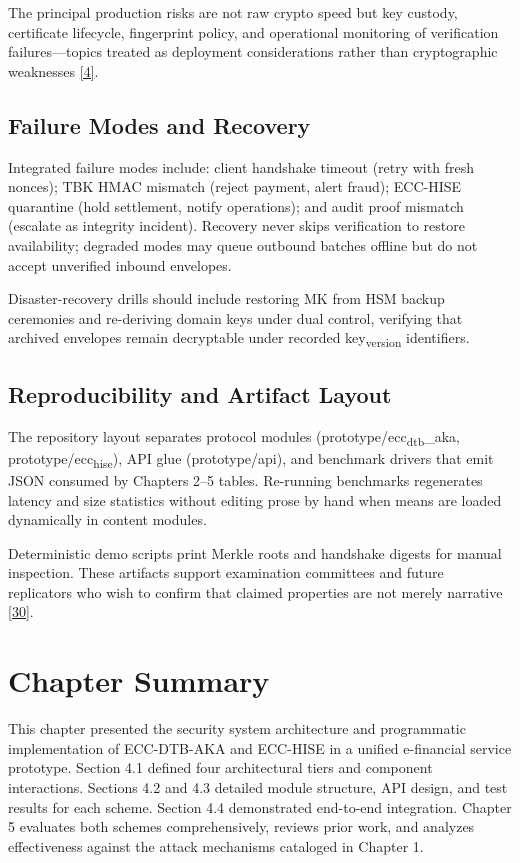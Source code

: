 \indent The principal production risks are not raw crypto speed but key custody, certificate lifecycle, fingerprint policy, and operational monitoring of verification failures---topics treated as deployment considerations rather than cryptographic weaknesses \hyperref[ref:4]{[4]}.

\subsection{Failure Modes and Recovery}

\indent Integrated failure modes include: client handshake timeout (retry with fresh nonces); TBK HMAC mismatch (reject payment, alert fraud); ECC-HISE quarantine (hold settlement, notify operations); and audit proof mismatch (escalate as integrity incident). Recovery never skips verification to restore availability; degraded modes may queue outbound batches offline but do not accept unverified inbound envelopes.

\indent Disaster-recovery drills should include restoring MK from HSM backup ceremonies and re-deriving domain keys under dual control, verifying that archived envelopes remain decryptable under recorded key\textsubscript{version} identifiers.

\subsection{Reproducibility and Artifact Layout}

\indent The repository layout separates protocol modules (prototype/ecc\textsubscript{dtb}\_aka, prototype/ecc\textsubscript{hise}), API glue (prototype/api), and benchmark drivers that emit JSON consumed by Chapters 2--5 tables. Re-running benchmarks regenerates latency and size statistics without editing prose by hand when means are loaded dynamically in content modules.

\indent Deterministic demo scripts print Merkle roots and handshake digests for manual inspection. These artifacts support examination committees and future replicators who wish to confirm that claimed properties are not merely narrative \hyperref[ref:30]{[30]}.

\section{Chapter Summary}

\indent This chapter presented the security system architecture and programmatic implementation of ECC-DTB-AKA and ECC-HISE in a unified e-financial service prototype. Section 4.1 defined four architectural tiers and component interactions. Sections 4.2 and 4.3 detailed module structure, API design, and test results for each scheme. Section 4.4 demonstrated end-to-end integration. Chapter 5 evaluates both schemes comprehensively, reviews prior work, and analyzes effectiveness against the attack mechanisms cataloged in Chapter 1.

